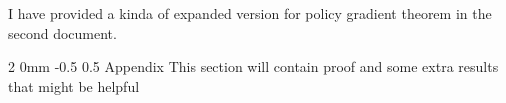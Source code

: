 \documentclass[twocolumn,11pt]{article}
\makeatletter
\DeclareMathOperator{\E}{\mathbb{E}}
\DeclareMathOperator{\w}{\textbf{w}}
\DeclareMathOperator{\vp}{v_\pi} %
\DeclareMathOperator{\bb}{\textbf{b}}
\DeclareMathOperator{\A}{ \textbf{A} }
\DeclareMathOperator{\D}{ \textbf{D} }
\DeclareMathOperator{\x}{\textbf{x}}
\renewcommand{\section}{\@startsection
{section}%
{2}%
{0mm}%
{-0.5\baselineskip}%
{0.5\baselineskip}%
{\bfseries\color{blue}}} %
\renewcommand{\subsection}{\@startsection
{subsection}%
{1}%
{0mm}%
{-0.5\baselineskip}%
{0.5\baselineskip}%
{\bfseries\color{blue}}} %
\makeatother
\begin{document}


I have provided a kinda of  expanded version for policy gradient theorem in the second document.
\onecolumn
\section{Appendix}
This section will contain proof and some extra results that might be helpful





\end{document}
